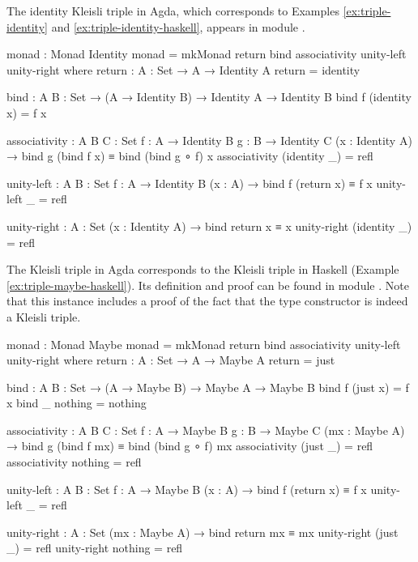 \begin{example}
  \label{ex:triple-id-agda}
  The identity Kleisli triple in Agda, which corresponds to Examples
  \ref{ex:triple-identity} and \ref{ex:triple-identity-haskell},
  appears in module .

  \begin{codeagda}
monad : Monad Identity
monad = mkMonad return bind associativity unity-left unity-right
  where
    return : {A : Set} → A → Identity A
    return = identity

    bind : {A B : Set} → (A → Identity B) → Identity A → Identity B
    bind f (identity x) = f x

    associativity : {A B C : Set} {f : A → Identity B} {g : B → Identity C}
                    (x : Identity A) → bind g (bind f x) ≡ bind (bind g ∘ f) x
    associativity (identity _) = refl

    unity-left : {A B : Set} {f : A → Identity B} (x : A) →
                 bind f (return x) ≡ f x
    unity-left _ = refl

    unity-right : {A : Set} (x : Identity A) → bind return x ≡ x
    unity-right (identity _) = refl
  \end{codeagda}
\end{example}

\begin{example}
  \label{ex:triple-maybe-agda}
  The  Kleisli triple in Agda corresponds to the
   Kleisli triple in Haskell (Example
  \ref{ex:triple-maybe-haskell}). Its definition and proof can be found in module
  . Note that this instance includes a
  proof of the fact that the  type constructor is
  indeed a Kleisli triple.

  \begin{codeagda}
monad : Monad Maybe
monad = mkMonad return bind associativity unity-left unity-right
  where
    return : {A : Set} → A → Maybe A
    return = just

    bind : {A B : Set} → (A → Maybe B) → Maybe A → Maybe B
    bind f (just x) = f x
    bind _ nothing  = nothing

    associativity : {A B C : Set} {f : A → Maybe B} {g : B → Maybe C}
                    (mx : Maybe A) → bind g (bind f mx) ≡ bind (bind g ∘ f) mx
    associativity (just _) = refl
    associativity nothing  = refl

    unity-left : {A B : Set} {f : A → Maybe B} (x : A) →
                 bind f (return x) ≡ f x
    unity-left _ = refl

    unity-right : {A : Set} (mx : Maybe A) → bind return mx ≡ mx
    unity-right (just _) = refl
    unity-right nothing  = refl
  \end{codeagda}
\end{example}

